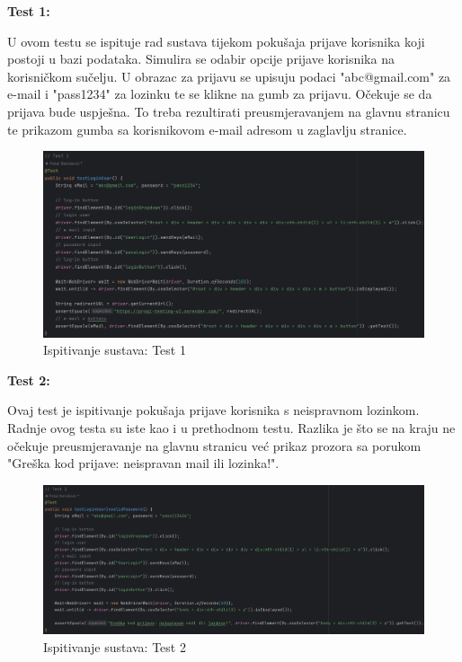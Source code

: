 		 	\textbf{Test 1:}
		 	
		 	U ovom testu se ispituje rad sustava tijekom pokušaja prijave korisnika koji postoji u bazi podataka. Simulira se odabir opcije prijave korisnika na korisničkom sučelju. U obrazac za prijavu se upisuju podaci "abc@gmail.com" za e-mail i "pass1234" za lozinku te se klikne na gumb za prijavu. Očekuje se da prijava bude uspješna. To treba rezultirati preusmjeravanjem na glavnu stranicu te prikazom gumba sa korisnikovom e-mail adresom u zaglavlju stranice.
		 	
		 	\begin{figure}[H]
		 		\includegraphics[width=\textwidth]{slike/SeleniumTest1.png} %
		 		\caption{Ispitivanje sustava: Test 1}
		 		\label{fig:SeleniumTest1} %
		 	\end{figure}
		 	
		 	\textbf{Test 2:}
		 	
		 	Ovaj test je ispitivanje pokušaja prijave korisnika s neispravnom lozinkom. Radnje ovog testa su iste kao i u prethodnom testu. Razlika je što se na kraju ne očekuje preusmjeravanje na glavnu stranicu već prikaz prozora sa porukom "Greška kod prijave: neispravan mail ili lozinka!".
		 	
		 	\begin{figure}[H]
		 		\includegraphics[width=\textwidth]{slike/SeleniumTest2.png} %
		 		\caption{Ispitivanje sustava: Test 2}
		 		\label{fig:SeleniumTest2} %
		 	\end{figure}
		 	
